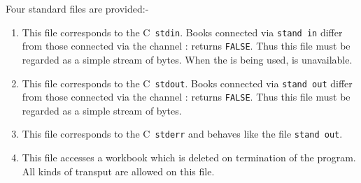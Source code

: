Four standard files are provided:-
\begin{enumerate}
\item {}\newline
This file corresponds to the C~\verb|stdin|. Books connected via
\verb|stand in| differ from those connected via the channel
:  returns \verb|FALSE|. Thus
this file must be regarded as a simple stream of bytes. When the
 is being used,  is unavailable.
\item {}\newline
This file corresponds to the C~\verb|stdout|. Books connected via
\verb|stand out| differ from those connected via the channel
:  returns \verb|FALSE|.
Thus this file must be regarded as a simple stream of bytes.
\item {}\newline
This file corresponds to the C~\verb|stderr| and behaves like the file
\verb|stand out|.
\item {}\newline
This file accesses a workbook which is deleted on termination of the
program. All kinds of transput are allowed on this file.
\end{enumerate}

